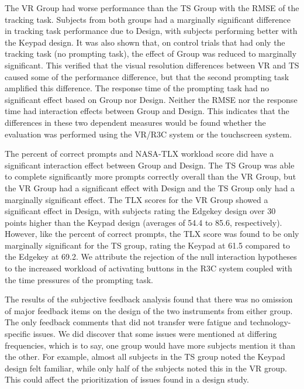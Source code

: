 The VR Group had worse performance than the TS Group with the RMSE of the tracking task.
Subjects from both groups had a marginally significant difference in tracking task performance due to Design, with subjects performing better with the Keypad design.
It was also shown that, on control trials that had only the tracking task (no prompting task), the effect of Group was reduced to marginally significant.
This verified that the visual resolution differences between VR and TS caused some of the performance difference, but that the second prompting task amplified this difference.
The response time of the prompting task had no significant effect based on Group nor Design.
Neither the RMSE nor the response time had interaction effects between Group and Design.
This indicates that the differences in these two dependent measures would be found whether the evaluation was performed using the VR/R3C system or the touchscreen system.

The percent of correct prompts and NASA-TLX workload score did have a significant interaction effect between Group and Design.
The TS Group was able to complete significantly more prompts correctly overall than the VR Group, but the VR Group had a significant effect with Design and the TS Group only had a marginally significant effect.
The TLX scores for the VR Group showed a significant effect in Design, with subjects rating the Edgekey design over 30 points higher than the Keypad design (averages of 54.4 to 85.6, respectively).
However, like the percent of correct prompts, the TLX score was found to be only marginally significant for the TS group, rating the Keypad at 61.5 compared to the Edgekey at 69.2.
We attribute the rejection of the null interaction hypotheses to the increased workload of activating buttons in the R3C system coupled with the time pressures of the prompting task.

The results of the subjective feedback analysis found that there was no omission of major feedback items on the design of the two instruments from either group.
The only feedback comments that did not transfer were fatigue and technology-specific issues.
We did discover that some issues were mentioned at differing frequencies, which is to say, one group would have more subjects mention it than the other.
For example, almost all subjects in the TS group noted the Keypad design felt familiar, while only half of the subjects noted this in the VR group.
This could affect the prioritization of issues found in a design study.

